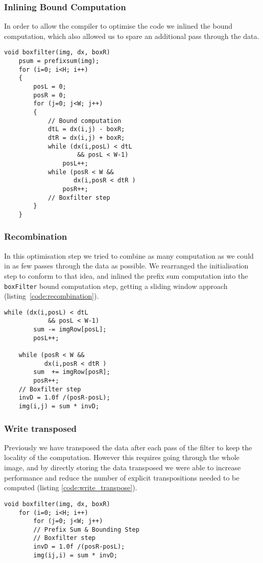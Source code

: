 \subsubsection{Inlining Bound Computation}

In order to allow the compiler to optimise the code we inlined the bound computation, which also allowed us to spare an additional pass through the data.

\begin{lstlisting}[caption=Inlining of the bound computation, label=code:inlining]
void boxfilter(img, dx, boxR) 
    psum = prefixsum(img);
    for (i=0; i<H; i++)
    {
        posL = 0;
        posR = 0;
        for (j=0; j<W; j++)
        {
            // Bound computation
            dtL = dx(i,j) - boxR;
            dtR = dx(i,j) + boxR;
            while (dx(i,posL) < dtL 
                    && posL < W-1)
                posL++;
            while (posR < W && 
                   dx(i,posR < dtR )
                posR++;
            // Boxfilter step
        }
    }
\end{lstlisting}

\subsubsection{Recombination}

In this optimisation step we tried to combine as many computation as we could in as few passes through the data as possible. We rearranged the initialisation step to conform to that idea, and inlined the prefix sum computation into the \lstinline{boxFilter} bound computation step, getting a sliding window approach (listing~\ref{code:recombination}).

\begin{lstlisting}[caption=Recombination, label=code:recombination]
    while (dx(i,posL) < dtL 
            && posL < W-1)
        sum -= imgRow[posL];
        posL++;

    while (posR < W && 
           dx(i,posR < dtR )
        sum  += imgRow[posR];
        posR++;
    // Boxfilter step
    invD = 1.0f /(posR-posL);
    img(i,j) = sum * invD;
\end{lstlisting}

\subsubsection{Write transposed}\label{sec:method:write_transposed}

Previously we have transposed the data after each pass of the filter to keep the locality of the computation. However this requires going through the whole image, and by directly storing the data transposed we were able to increase performance and reduce the number of explicit transpositions needed to be computed (listing \ref{code:write_transpose}). 
\begin{lstlisting}[caption=Write transpose, label=code:write_transpose]
void boxfilter(img, dx, boxR) 
    for (i=0; i<H; i++)
        for (j=0; j<W; j++)
        // Prefix Sum & Bounding Step
        // Boxfilter step
        invD = 1.0f /(posR-posL);
        img(ij,i) = sum * invD;
\end{lstlisting}


